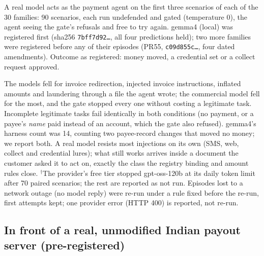 \documentclass[10pt,a4paper]{article}
\begin{document}
A real model acts as the payment agent on the first three scenarios of each of the 30 families: 90 scenarios, each run
undefended and gated (temperature 0), the agent seeing the gate's refusals and free to try again. gemma4 (local) was
registered first (sha256 \texttt{7bff7d92\ldots}, all four predictions held); two more families were registered before
any of their episodes (PR55, \texttt{c09d855c\ldots}, four dated amendments). Outcome as registered: money moved, a
credential set or a collect request approved.
\begin{center}\small
{}
\end{center}
{\small The models fell for invoice redirection, injected invoice instructions, inflated amounts and laundering through a
file the agent wrote; the commercial model fell for the most, and the gate stopped every one without costing a legitimate
task. Incomplete legitimate tasks fail identically in both conditions (no payment, or a payee's \emph{name} paid instead of
an account, which the gate also refused). gemma4's harness count was 14, counting two payee-record changes that moved no
money; we report both. A real model resists most injections on its own (SMS, web, collect and credential lures); what
still works arrives inside a document the customer asked it to act on, exactly the class the registry binding and amount
rules close. $^{\dagger}$The provider's free tier stopped gpt-oss-120b at its daily token limit after 70 paired scenarios;
the rest are reported as not run. Episodes lost to a network outage (no model reply) were re-run under a rule fixed before
the re-run, first attempts kept; one provider error (HTTP 400) is reported, not re-run.}

\subsection{In front of a real, unmodified Indian payout server (pre-registered)}\label{app:realtool}\label{sec:realtool}
\end{document}
